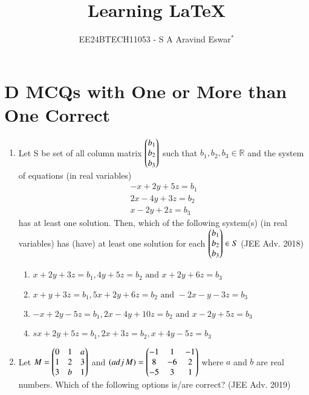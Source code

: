 \documentclass[journal,12pt,twocolumn]{IEEEtran}
\theoremstyle{remark}
\begin{document}

\vspace{3cm}

\title{Learning {\LaTeX}}
\author{EE24BTECH11053 - S A Aravind Eswar$^{*}$}
\maketitle
\newpage
\bigskip

\renewcommand{\thefigure}{\theenumi}
\renewcommand{\thetable}{\theenumi}
\section{D MCQs with One or More than One Correct}
\begin{enumerate}
\item Let S be set of all column matrix $\begin{pmatrix}b_1\\b_2\\b_3\end{pmatrix}$ such that $b_1, b_2, b_3 \in \mathbb{R}$ and the system of equations (in real variables)\begin{align*}-x+2y+5z=b_1\\2x-4y+3z=b_2\\x-2y+2z=b_3\end{align*} has at least one solution. Then, which of the following system(s) (in real variables) has (have) at least one solution for each $\begin{pmatrix}b_1\\b_2\\b_3\end{pmatrix}\in S$ \hfill(JEE Adv. 2018)

\begin{enumerate}
    \item $x+2y+3z=b_1, 4y+5z=b_2 \text{ and }x+2y+6z=b_3$
    \item $x+y+3z=b_1, 5x+2y+6z=b_2\text{ and }-2x-y-3z=b_3$
    \item $-x+2y-5z=b_1,2x-4y+10z=b_2\text{ and }x-2y+5z=b_3$
    \item $sx+2y+5z=b_1,2x+3z=b_2,x+4y-5z=b_3$\\[2pt]
\end{enumerate}

\item Let $M=\begin{pmatrix}
    0 & 1 & a\\
    1 & 2 & 3\\
    3 & b & 1
\end{pmatrix}$ and $(\mathop{adj}M)=\begin{pmatrix}
    -1 & 1 & -1\\
    8 & -6 & 2\\
    -5 & 3 & 1
\end{pmatrix}$ where $a$ and $b$ are real numbers. Which of the following options is/are correct? \hfill (JEE Adv. 2019)


\end{enumerate}
\end{document}
